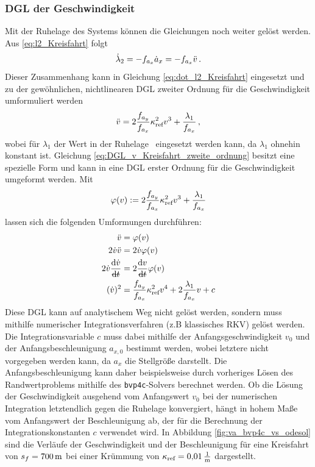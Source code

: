 \subsubsection{\gls{DGL} der Geschwindigkeit}
Mit der Ruhelage des Systems können die Gleichungen noch weiter gelöst werden. Aus \eqref{eq:l2_Kreisfahrt} folgt 
\begin{equation}
\dot{\lambda}_2 = -f_{a_x} \dot{a}_x = -f_{a_x} \ddot{v}\,. 
\end{equation}
Dieser Zusammenhang kann in Gleichung \eqref{eq:dot_l2_Kreisfahrt} eingesetzt und zu der gewöhnlichen, nichtlinearen \gls{DGL} zweiter Ordnung für die Geschwindigkeit umformuliert werden
\begin{equation}
\ddot{v} = 2\frac{f_{a_y}}{f_{a_x}}\kappa_{\textrm{ref}}^2v^3+\frac{\lambda_1}{f_{a_x}}\,, \label{eq:DGL_v_Kreisfahrt_zweite_ordnung}
\end{equation}
wobei für $\lambda_1$ der Wert in der Ruhelage \loneRL~eingesetzt werden kann, da $\lambda_1$ ohnehin konstant ist. Gleichung \eqref{eq:DGL_v_Kreisfahrt_zweite_ordnung} besitzt eine spezielle Form und kann in eine \gls{DGL} erster Ordnung für die Geschwindigkeit umgeformt werden. Mit 
\begin{equation}
	\varphi(v) := 2\frac{f_{a_y}}{f_{a_x}}\kappa_{\textrm{ref}}^2v^3+\frac{\lambda_1}{f_{a_x}}
\end{equation}
lassen sich die folgenden Umformungen durchführen:
\begin{align}
	\ddot{v} &= \varphi(v) \\
	2\dot{v} \ddot{v} &= 2\dot{v}\varphi(v)\\
	2\dot{v} \frac{\textrm{d}\dot{v}}{\stkout{\textrm{d}t}} &= 2\frac{\textrm{d}v}{\stkout{\textrm{d}t}}\varphi(v)\\
	(\dot{v})^2 &= \frac{\fay}{\fax}\kapparef^2v^4+2\frac{\lambda_1}{\fax}v + c \label{eq:DGL_v_Kreisfahrt_erste_ordnung}
\end{align}
Diese \gls{DGL} kann auf analytischem Weg nicht gelöst werden, sondern muss mithilfe numerischer Integrationsverfahren (z.B klassisches \gls{RKV}) gelöst werden. Die Integrationsvariable $c$ muss dabei mithilfe der Anfangsgeschwindigkeit $v_0$ und der  Anfangsbeschleunigung $a_{x,0}$ bestimmt werden, wobei letztere nicht vorgegeben werden kann, da $a_x$ die Stellgröße darstellt. Die Anfangsbeschleunigung kann daher beispielsweise durch vorheriges Lösen des Randwertproblems mithilfe des \texttt{bvp4c}-Solvers berechnet werden. Ob die Lösung der Geschwindigkeit ausgehend vom Anfangswert $v_0$ bei der numerischen Integration letztendlich gegen die Ruhelage konvergiert, hängt in hohem Maße vom Anfangswert der Beschleunigung ab, der für die Berechnung der Integrationskonstanten $c$ verwendet wird. In Abbildung \ref{fig:va_bvp4c_vs_odesol} sind die Verläufe der Geschwindigkeit und der Beschleunigung für eine Kreisfahrt von $s_f = 700\,\mathrm{m}$ bei einer Krümmung von $\kappa_{\textrm{ref}} = 0{,}01\,\mathrm{\frac{1}{\mathrm{m}}}$ dargestellt. 
